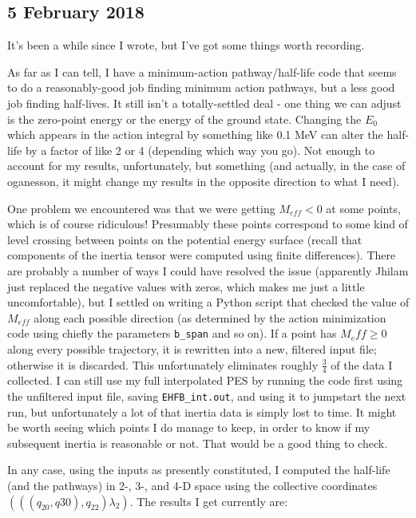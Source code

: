 \subsection*{5 February 2018}
It's been a while since I wrote, but I've got some things worth recording.

As far as I can tell, I have a minimum-action pathway/half-life code that seems to do a reasonably-good job finding minimum action pathways, but a less good job finding half-lives. It still isn't a totally-settled deal - one thing we can adjust is the zero-point energy or the energy of the ground state. Changing the $E_0$ which appears in the action integral by something like 0.1 MeV can alter the half-life by a factor of like 2 or 4 (depending which way you go). Not enough to account for my results, unfortunately, but something (and actually, in the case of oganesson, it might change my results in the opposite direction to what I need).

One problem we encountered was that we were getting $M_{eff}<0$ at some points, which is of course ridiculous! Presumably these points correspond to some kind of level crossing between points on the potential energy surface (recall that components of the inertia tensor were computed using finite differences). There are probably a number of ways I could have resolved the issue (apparently Jhilam just replaced the negative values with zeros, which makes me just a little uncomfortable), but I settled on writing a Python script that checked the value of $M_{eff}$ along each possible direction (as determined by the action minimization code using chiefly the parameters \texttt{b\_span} and so on). If a point has $M_eff\geq0$ along every possible trajectory, it is rewritten into a new, filtered input file; otherwise it is discarded. This unfortunately eliminates roughly $\frac{3}{4}$ of the data I collected. I can still use my full interpolated PES by running the code first using the unfiltered input file, saving \texttt{EHFB\_int.out}, and using it to jumpstart the next run, but unfortunately a lot of that inertia data is simply lost to time. It might be worth seeing which points I do manage to keep, in order to know if my subsequent inertia is reasonable or not. That would be a good thing to check.

In any case, using the inputs as presently constituted, I computed the half-life (and the pathways) in 2-, 3-, and 4-D space using the collective coordinates $(((q_{20},q{30}),q_{22})\lambda_2)$. The results I get currently are:

